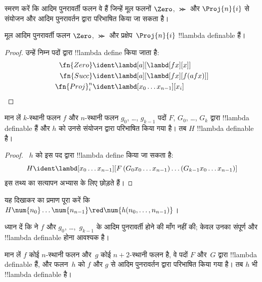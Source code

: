 \documentclass[../../../include/open-logic-section]{subfiles}
\begin{document}

स्मरण करें कि आदिम पुनरावर्ती फलन वे हैं जिन्हें मूल फलनों $\Zero$,
$\Succ$ और $\Proj{n}{i}$ से संयोजन और आदिम पुनरावर्तन द्वारा परिभाषित किया
जा सकता है।

\begin{lem}
  मूल आदिम पुनरावर्ती फलन $\Zero$, $\Succ$ और प्रक्षेप~$\Proj{n}{i}$
  !!{lambda definable} हैं।
\end{lem}

\begin{proof}
उन्हें निम्न पदों द्वारा !!{lambda define} किया जाता है:
\begin{align*}
  \fn{Zero} & \ident \lambd[a][\lambd[fx][x]]\\
  \fn{Succ} & \ident \lambd[a][\lambd[fx][f (a f x)]] \\
  \fn{Proj}^n_i & \ident \lambd[x_0\dots x_{n-1}][x_i]
\end{align*}
\end{proof}

\begin{lem}
   मान लें $k$-स्थानी फलन $f$ और $n$-स्थानी फलन $g_0$,
  \dots, $g_{k-1}$ पदों $F$, $G_0$, \dots, $G_k$ द्वारा !!{lambda
  definable} हैं और $h$ को उनसे संयोजन द्वारा परिभाषित किया गया है। तब $H$
  !!{lambda definable} है।
\end{lem}

\begin{proof}
  ~$h$ को इस पद द्वारा !!{lambda define} किया जा सकता है:
  \[
  H \ident \lambd[x_0 \dots x_{n-1}][F\, (G_0 x_0 \dots
    x_{n-1}) \dots (G_{k-1} x_0 \dots x_{n-1})]
  \]
  इस तथ्य का सत्यापन अभ्यास के लिए छोड़ते हैं।
\end{proof}

\begin{prob}
  यह दिखाकर  का प्रमाण पूरा करें कि
  $H\num{n_0}\dots\num{n_{n-1}} \red \num{h(n_0, \dots,
    n_{n-1})}$।
\end{prob}

ध्यान दें कि  ने $f$ और $g_0$, \dots,~$g_{k-1}$ के आदिम
पुनरावर्ती होने की माँग नहीं की; केवल उनका संपूर्ण और !!{lambda definable}
होना आवश्यक है।

\begin{lem}
  मान लें $f$ कोई $n$-स्थानी फलन और~$g$ कोई $n+2$-स्थानी फलन है, वे पदों
  $F$ और~$G$ द्वारा !!{lambda definable} हैं, और फलन~$h$ को $f$ और $g$ से
  आदिम पुनरावर्तन द्वारा परिभाषित किया गया है। तब $h$ भी !!{lambda
  definable} है।
\end{lem}
\end{document}
